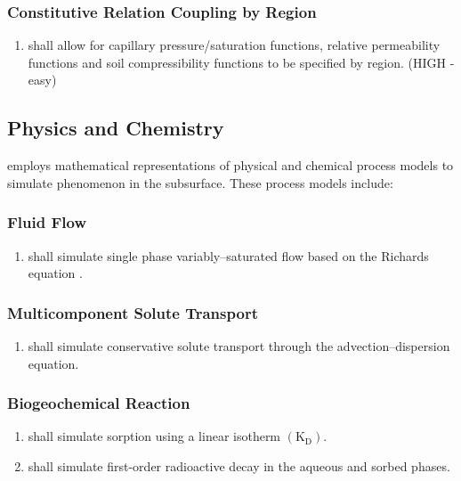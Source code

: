 \subsubsection{Constitutive Relation Coupling by Region}
\begin{enumerate}[resume]
	\item \pft shall allow for capillary pressure/saturation functions, relative permeability functions and soil compressibility functions to be specified by region. \label{CRbyRegion} (HIGH - easy)
\end{enumerate}

\subsection{Physics and Chemistry}
\pft employs mathematical representations of physical and chemical process models to simulate phenomenon in the subsurface.  These process models include:
\subsubsection{Fluid Flow}
\begin{enumerate}
	\item \label{PCSngVarSatFlow} \pft shall simulate single phase variably--saturated flow based on the Richards equation \cite{richards1931}. 
\end{enumerate}

\subsubsection{Multicomponent Solute Transport}
\begin{enumerate}[resume]
	\item \label{PCTranConservative} \pft shall simulate conservative solute transport through the advection--dispersion equation. 
\end{enumerate}
\subsubsection{Biogeochemical Reaction}
\begin{enumerate}[resume]
	\item \label{PCRxnKD} \pft shall simulate sorption using a linear isotherm $\left(\text{K}_\text{D}\right)$. 
	\item \label{PCRxnDecay} \pft shall simulate first-order radioactive decay in the aqueous and sorbed phases. 
\end{enumerate}

